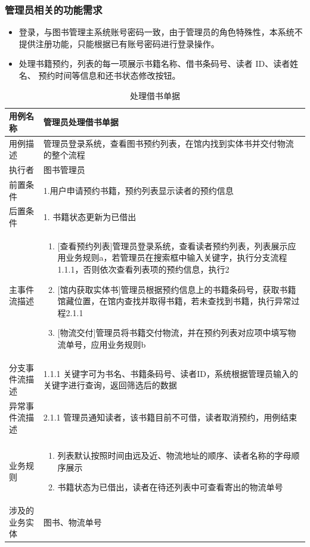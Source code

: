 \subsubsection{管理员相关的功能需求}
\begin{itemize}
    \item 登录，与图书管理主系统账号密码一致，由于管理员的角色特殊性，本系统不 提供注册功能，只能根据已有账号密码进行登录操作。
    \item 处理书籍预约，列表的每一项展示书籍名称、借书条码号、读者 ID、读者姓名、 预约时间等信息和还书状态修改按钮。
\end{itemize}
\begin{table}[hp]
    \centering
    \caption{处理借书单据}
	\begin{tabular*}{\textwidth}{p{}|p{}}
    \hline
    用例名称    & 管理员处理借书单据    \\ \hline
    用例描述    & 管理员登录系统，查看图书预约列表，在馆内找到实体书并交付物流的整个流程   \\ \hline
    执行者     & 图书管理员       \\ \hline
    前置条件    & 1.用户申请预约书籍，预约列表显示读者的预约信息  \\ \hline
    后置条件    & 1. 书籍状态更新为已借出    \\ \hline
    主事件流描述  & \begin{enumerate} 
            \item {[查看预约列表]}管理员登录系统，查看读者预约列表，列表展示应用业务规则a，若管理员在搜索框中输入关键字，执行分支流程1.1.1，否则依次查看列表项的预约信息，执行2
            \item {[馆内获取实体书]}管理员根据预约信息上的书籍条码号，获取书籍馆藏位置，在馆内查找并取得书籍，若未查找到书籍，执行异常过程2.1.1
            \item {[物流交付]}管理员将书籍交付物流，并在预约列表对应项中填写物流单号，应用业务规则b
        \end{enumerate} \\ \hline
    分支事件流描述 & 1.1.1 关键字可为书名、书籍条码号、读者ID，系统根据管理员输入的关键字进行查询，返回筛选后的数据    \\ \hline
    异常事件流描述 & 2.1.1 管理员通知读者，该书籍目前不可借，读者取消预约，用例结束 \\ \hline                                                                            \\ \hline
    业务规则    &  \begin{enumerate}[label=\alph*]
        \item 列表默认按照时间由远及近、物流地址的顺序、读者名称的字母顺序展示
        \item 书籍状态为已借出，读者在待还列表中可查看寄出的物流单号    
    \end{enumerate} \\ \hline
    涉及的业务实体 & 图书、物流单号    \\ \hline
\end{tabular*}
\end{table}
